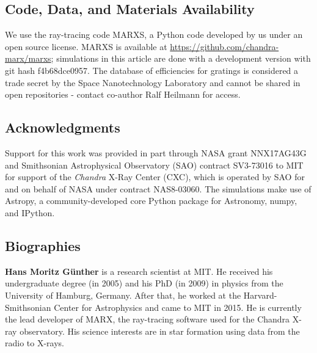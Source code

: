 \documentclass[12pt]{spieman}  %
\begin{document}
\begin{spacing}{1}
\subsection* {Code, Data, and Materials Availability}
We use the ray-tracing code MARXS\cite{marxs1.1,2017AJ....154..243G}, a Python code developed by us under an open source license. MARXS is available at \url{https://github.com/chandra-marx/marxs}; simulations in this article are done with a development version with git hash f4b68dce0957. The database of efficiencies for gratings is considered a trade secret by the Space Nanotechnology Laboratory and cannot be shared in open repositories - contact co-author Ralf Heilmann for access.




\subsection* {Acknowledgments}
Support
for this work was provided in part through NASA grant NNX17AG43G and
Smithsonian Astrophysical Observatory (SAO) contract SV3-73016 to MIT
for support of the {\em Chandra} X-Ray Center (CXC), which is operated
by SAO for and on behalf of NASA under contract NAS8-03060.  The
simulations make use of Astropy, a community-developed core Python
package for Astronomy\cite{astropy:2022}, numpy\cite{numpy}, and IPython\cite{IPython}.




\subsection*{Biographies}
\vspace{2ex}\noindent\textbf{Hans Moritz G\"unther} is a research scientist at MIT. He received his undergraduate degree (in 2005) and his PhD (in 2009) in physics from the University of Hamburg, Germany. After that, he worked at the Harvard-Smithsonian Center for Astrophysics and came to MIT in 2015. He is currently the lead developer of MARX, the ray-tracing software used for the Chandra X-ray observatory. His science interests are in star formation using data from the radio to X-rays.


\end{spacing}
\end{document}
